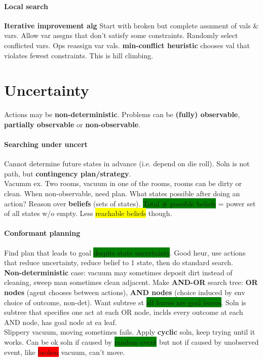 \paragraph{Local search} \textbf{Iterative improvement alg} Start with
broken but complete assnment of vals \& vars. Allow var assgns that
don't satisfy some constraints. Randomly select conflicted vars. Ops
reassign var vals. \textbf{min-conflict heuristic} chooses val that
violates fewest constraints. This is hill climbing.
\color[HTML]{8b0000}
\section{Uncertainty} Actions may be
\textbf{non-deterministic}. Problems can be \textbf{(fully) observable},
\textbf{partially observable} or \textbf{non-observable}.
\paragraph{Searching under uncert} Cannot determine future states in
advance (i.e. depend on die roll). Soln is not path, but
\textbf{contingency plan/strategy}.
\\ Vacumm ex. Two rooms, vacuum in one of the rooms, rooms can be
dirty or clean. When non-observable, need plan. What states possible
after doing an action? Reason over \textbf{beliefs} (sets of
states). \colorbox{green}{Total \# possible beliefs} = power set of
all states w/o empty. Less \colorbox{yellow}{reachable beliefs}
though.
\paragraph{Conformant planning} Find plan that leads to goal
\colorbox{green}{despite state uncertainty}. Good heur, use actions
that reduce uncertainty, reduce belief to 1 state, then do standard
search.
\\ \textbf{Non-deterministic} case: vacuum may sometimes deposit dirt
instead of cleaning, sweep man sometimes clean adjacent. Make
\textbf{AND-OR} search tree: \textbf{OR nodes} (agent chooses between
actions), \textbf{AND nodes} (choice induced by env choice of outcome,
non-det). Want subtree st \colorbox{green}{all leaves are goal
  leaves}. Soln is subtree that specifies one act at each OR node,
inclds every outcome at each AND node, has goal node at ea leaf.
\\ Slippery vacuum, moving sometimes fails. Apply \textbf{cyclic}
soln, keep trying until it works. Can be ok soln if caused by
\colorbox{green}{random event} but not if caused by unobserved event,
like \colorbox{red}{broken} vacuum, can't move.
